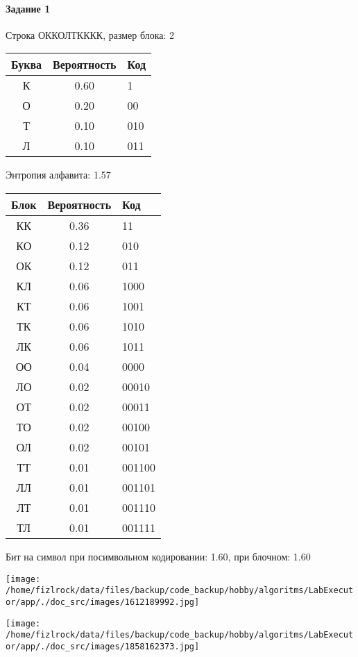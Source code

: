 \documentclass[a4paper, 12pt]{article}
\begin{document}
\paragraph{Задание 1}

Строка ОККОЛТКККК, размер блока: 2
\begin{center}
 \begin{tabular}{ |c|c|l| } 
  \hline
     Буква & Вероятность & Код\\ \hline
К & 0.60 & 1\\\hline
О & 0.20 & 00\\\hline
Т & 0.10 & 010\\\hline
Л & 0.10 & 011
\\ \hline \end{tabular}
\end{center}
Энтропия алфавита: 1.57
\begin{center}
 \begin{tabular}{ |c|c|l| } 
  \hline
     Блок & Вероятность & Код\\ \hline
КК & 0.36 & 11\\\hline
КО & 0.12 & 010\\\hline
ОК & 0.12 & 011\\\hline
КЛ & 0.06 & 1000\\\hline
КТ & 0.06 & 1001\\\hline
ТК & 0.06 & 1010\\\hline
ЛК & 0.06 & 1011\\\hline
ОО & 0.04 & 0000\\\hline
ЛО & 0.02 & 00010\\\hline
ОТ & 0.02 & 00011\\\hline
ТО & 0.02 & 00100\\\hline
ОЛ & 0.02 & 00101\\\hline
ТТ & 0.01 & 001100\\\hline
ЛЛ & 0.01 & 001101\\\hline
ЛТ & 0.01 & 001110\\\hline
ТЛ & 0.01 & 001111
\\ \hline \end{tabular}
\end{center}
Бит на символ при посимвольном кодировании: 1.60, при блочном: 1.60

\texttt{[image: /home/fizlrock/data/files/backup/code\_backup/hobby/algoritms/LabExecutor/app/./doc\_src/images/1612189992.jpg]}

\texttt{[image: /home/fizlrock/data/files/backup/code\_backup/hobby/algoritms/LabExecutor/app/./doc\_src/images/1858162373.jpg]}
\pagebreak
\end{document}

